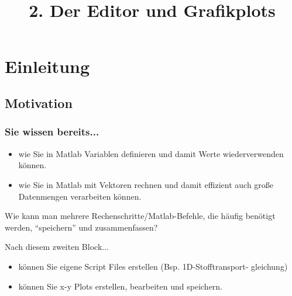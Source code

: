 

\title{\\{\scriptsize 2. Der Editor und Grafikplots}}


\setcounter{mexercise}{0}


  

    \section{Einleitung}

    \subsection{Motivation}
    \begin{frame}
        \frametitle{Sie wissen bereits...}
        \begin{itemize}
            \item wie Sie in Matlab Variablen definieren und damit Werte wiederverwenden können.
            \item wie Sie in Matlab mit Vektoren rechnen und damit effizient auch große Datenmengen verarbeiten können.
        \end{itemize}

        \vspace{0.3cm}

        Wie kann man mehrere Rechenschritte/Matlab-Befehle, die häufig benötigt werden, ``speichern'' und zusammenfassen? \\

        \vspace{0.3cm}

        Nach diesem zweiten Block... \\

        \vspace{0.3cm}

        \begin{itemize}
            \item können Sie eigene Script Files erstellen (Bsp. 1D-Stofftransport- gleichung)
            \item können Sie x-y Plots erstellen, bearbeiten und speichern.
        \end{itemize}
    \end{frame}


